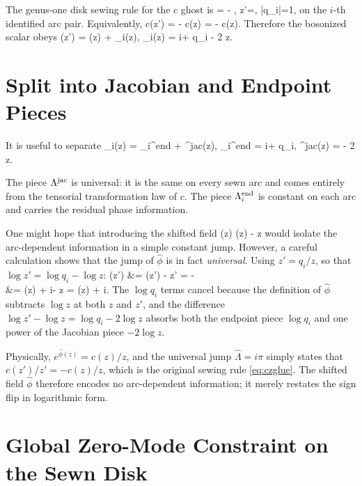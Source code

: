 \documentclass[12pt]{article}
\begin{document}
The genus-one disk sewing rule for the $c$ ghost is
\be
{} = - ,
\qquad
z'=,
\qquad
|q_i|=1,
\label{eq:czglue}
\ee
on the $i$-th identified arc pair. Equivalently,
\be
c(z') = -  c(z)
= -  c(z).
\ee
Therefore the bosonized scalar obeys
\be
\phi(z') = \phi(z) + \Lambda_i(z),
\qquad
\Lambda_i(z) = i\pi + \log q_i - 2 \log z.
\label{eq:phijump}
\ee

\section{Split into Jacobian and Endpoint Pieces}

It is useful to separate
\be
\Lambda_i(z) = \Lambda_i^{\rm end} + \Lambda^{\rm jac}(z),
\qquad
\Lambda_i^{\rm end} = i\pi + \log q_i,
\qquad
\Lambda^{\rm jac}(z) = - 2 \log z.
\label{eq:lambdasplit}
\ee

The piece $\Lambda^{\rm jac}$ is universal: it is the same on every sewn arc and comes entirely from the tensorial transformation law of $c$. The piece $\Lambda_i^{\rm end}$ is constant on each arc and carries the residual phase information.

One might hope that introducing the shifted field
\be
\hat{\phi}(z) \equiv \phi(z) - \log z
\label{eq:phihatdef}
\ee
would isolate the arc-dependent information in a simple constant jump. However, a careful calculation shows that the jump of $\hat\phi$ is in fact \emph{universal}. Using $z' = q_i/z$, so that $\log z' = \log q_i - \log z$:
\ie
\hat{\phi}(z')
&= \phi(z') - \log z'
=  - 
\\
&= \phi(z) + i\pi - \log z
= \hat{\phi}(z) + i\pi.
\label{eq:phihatjump}
\fe
The $\log q_i$ terms cancel because the definition of $\hat\phi$ subtracts $\log z$ at both $z$ and $z'$, and the difference $\log z' - \log z = \log q_i - 2\log z$ absorbs both the endpoint piece $\log q_i$ and one power of the Jacobian piece $-2\log z$.

Physically, $e^{\hat\phi(z)} = c(z)/z$, and the universal jump $\hat\Lambda = i\pi$ simply states that $c(z')/z' = -c(z)/z$, which is the original sewing rule \eqref{eq:czglue}. The shifted field $\hat\phi$ therefore encodes no arc-dependent information; it merely restates the sign flip in logarithmic form.

\section{Global Zero-Mode Constraint on the Sewn Disk}
\end{document}

